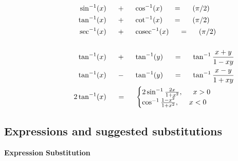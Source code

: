 \begin{align*}
\hspace{20mm} \sin^{-1}(x) \hspace{5mm} &+ \hspace{5mm} \cos^{-1}(x) \hspace{5mm} = \hspace{5mm} (\pi/2)\\
\hspace{20mm} \tan^{-1}(x) \hspace{5mm} &+ \hspace{5mm} \cot^{-1}(x) \hspace{5mm}  = \hspace{5mm} (\pi/2)\\
\hspace{20mm} \sec^{-1}(x) \hspace{5mm} &+ \hspace{5mm} \mathrm{cosec}^{-1}(x) \hspace{5mm} = \hspace{5mm} (\pi/2) \\ \\
\hspace{20mm} \tan^{-1}(x) \hspace{5mm} &+ \hspace{5mm} \tan^{-1}(y) \hspace{5mm} = \hspace{5mm} \tan^{-1}\frac{x+y}{1-xy}\\
\hspace{20mm} \tan^{-1}(x) \hspace{5mm} &- \hspace{5mm} \tan^{-1}(y) \hspace{5mm} = \hspace{5mm} \tan^{-1}\frac{x-y}{1+xy}\\
\hspace{20mm} 2\tan^{-1}(x) \hspace{5mm} &= \hspace{5mm} 
\begin{cases}
2\sin^{-1}\frac{2x}{1+x^2}, \hspace{5mm}   x > 0 \\
\cos^{-1}\frac{1-x^2}{1+x^2}, \hspace{5mm} x < 0\\
\end{cases}
\end{align*}

\subsection{Expressions and suggested substitutions}
\hspace{45mm} \textbf{Expression} \hspace{30mm} \textbf{Substitution} \hspace{10mm}

